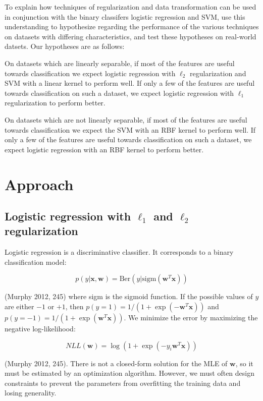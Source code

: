 \documentclass[letterpaper, 11pt]{article}
\newcommand{\vect}[1]{\boldsymbol{#1}}
\begin{document}
To explain how techniques of regularization and data transformation can be used in conjunction with the binary classifers logistic regression and SVM, use this understanding to hypothesize regarding the performance of the various techniques on datasets with differing characteristics, and test these hypotheses on real-world datsets. Our hypotheses are as follows:

On datasets which are linearly separable, if most of the features are useful towards classification we expect logistic regression with $\ell_2$ regularization and SVM with a linear kernel to perform well. If only a few of the features are useful towards classification on such a dataset, we expect logistic regression with $\ell_1$ regularization to perform better.

On datasets which are not linearly separable, if most of the features are useful towards classification we expect the SVM with an RBF kernel to perform well. If only a few of the features are useful towards classification on such a dataset, we expect logistic regression with an RBF kernel to perform better.

\section{Approach}

\subsection{Logistic regression with $\ell_1$ and $\ell_2$ regularization}

Logistic regression is a discriminative classifier. It corresponds to a binary classification model:

\begin{equation*}
  p(y | \vect{x}, \vect{w}) = \text{Ber}(y | \text{sigm}(\vect{w}^T\vect{x}))
\end{equation*}

(Murphy 2012, 245) where sigm is the sigmoid function. If the possible values of $y$ are either $-1$ or $+1$, then $p(y = 1) = 1 / (1 + \exp(-\vect{w}^T\vect{x}))$ and $p(y = -1) = 1 / (1 + \exp(\vect{w}^T\vect{x}))$. We minimize the error by maximizing the negative log-likelihood:

\begin{equation*}
  NLL(\vect{w}) = \log(1 + \exp(-y_i \vect{w}^T\vect{x}))
\end{equation*}

(Murphy 2012, 245). There is not a closed-form solution for the MLE of $\vect{w}$, so it must be estimated by an optimization algorithm. However, we must often design constraints to prevent the parameters from overfitting the training data and losing generality.
\end{document}
